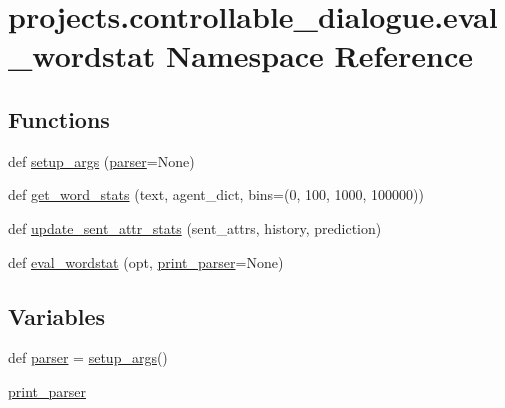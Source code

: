 \hypertarget{namespaceprojects_1_1controllable__dialogue_1_1eval__wordstat}{}\section{projects.\+controllable\+\_\+dialogue.\+eval\+\_\+wordstat Namespace Reference}
\label{namespaceprojects_1_1controllable__dialogue_1_1eval__wordstat}
\subsection*{Functions}
\begin{DoxyCompactItemize}
\item 
def \hyperlink{namespaceprojects_1_1controllable__dialogue_1_1eval__wordstat_aa40ff30af74bd5824589612828146ec8}{setup\+\_\+args} (\hyperlink{namespaceprojects_1_1controllable__dialogue_1_1eval__wordstat_a05732672672c5c3d67e5941ec220d589}{parser}=None)
\item 
def \hyperlink{namespaceprojects_1_1controllable__dialogue_1_1eval__wordstat_af8f7aeddab4a5c7f0a5597bdb09f40ae}{get\+\_\+word\+\_\+stats} (text, agent\+\_\+dict, bins=(0, 100, 1000, 100000))
\item 
def \hyperlink{namespaceprojects_1_1controllable__dialogue_1_1eval__wordstat_a1bc3cda7d486add0d740338df4688622}{update\+\_\+sent\+\_\+attr\+\_\+stats} (sent\+\_\+attrs, history, prediction)
\item 
def \hyperlink{namespaceprojects_1_1controllable__dialogue_1_1eval__wordstat_aa89fea1e83d255fa77e81e73a7d81161}{eval\+\_\+wordstat} (opt, \hyperlink{namespaceprojects_1_1controllable__dialogue_1_1eval__wordstat_ada9cf33816fefa715c6df2aee0b8125d}{print\+\_\+parser}=None)
\end{DoxyCompactItemize}
\subsection*{Variables}
\begin{DoxyCompactItemize}
\item 
def \hyperlink{namespaceprojects_1_1controllable__dialogue_1_1eval__wordstat_a05732672672c5c3d67e5941ec220d589}{parser} = \hyperlink{namespaceprojects_1_1controllable__dialogue_1_1eval__wordstat_aa40ff30af74bd5824589612828146ec8}{setup\+\_\+args}()
\item 
\hyperlink{namespaceprojects_1_1controllable__dialogue_1_1eval__wordstat_ada9cf33816fefa715c6df2aee0b8125d}{print\+\_\+parser}
\end{DoxyCompactItemize}


